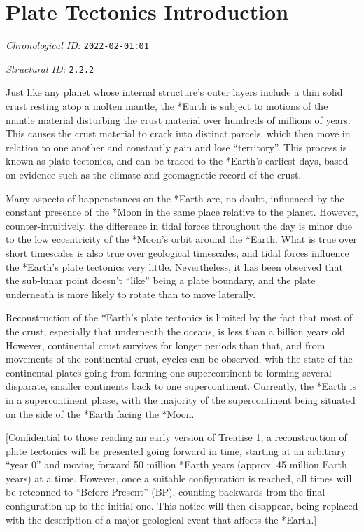\section{Plate Tectonics Introduction}
\emph{Chronological ID:} \texttt{2022-02-01:01}

\emph{Structural ID:} \texttt{2.2.2}

Just like any planet whose internal structure's outer layers include a thin solid crust resting atop a molten mantle, the *Earth is subject to motions of the mantle material disturbing the crust material over hundreds of millions of years. This causes the crust material to crack into distinct parcels, which then move in relation to one another and constantly gain and lose ``territory''. This process is known as plate tectonics, and can be traced to the *Earth's earliest days, based on evidence such as the climate and geomagnetic record of the crust.

Many aspects of happenstances on the *Earth are, no doubt, influenced by the constant presence of the *Moon in the same place relative to the planet. However, counter-intuitively, the difference in tidal forces throughout the day is minor due to the low eccentricity of the *Moon's orbit around the *Earth. What is true over short timescales is also true over geological timescales, and tidal forces influence the *Earth's plate tectonics very little. Nevertheless, it has been observed that the sub-lunar point doesn't ``like'' being a plate boundary, and the plate underneath is more likely to rotate than to move laterally.

Reconstruction of the *Earth's plate tectonics is limited by the fact that most of the crust, especially that underneath the oceans, is less than a billion years old. However, continental crust survives for longer periods than that, and from movements of the continental crust, cycles can be observed, with the state of the continental plates going from forming one supercontinent to forming several disparate, smaller continents back to one supercontinent. Currently, the *Earth is in a supercontinent phase, with the majority of the supercontinent being situated on the side of the *Earth facing the *Moon.

[Confidential to those reading an early version of Treatise 1, a reconstruction of plate tectonics will be presented going forward in time, starting at an arbitrary ``year 0'' and moving forward 50 million *Earth years (approx. 45 million Earth years) at a time. However, once a suitable configuration is reached, all times will be retconned to ``Before Present'' (BP), counting backwards from the final configuration up to the initial one. This notice will then disappear, being replaced with the description of a major geological event that affects the *Earth.]
\newpage
